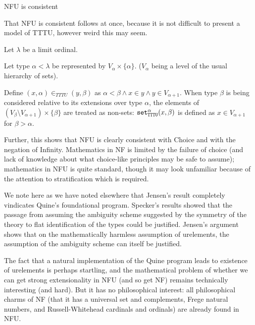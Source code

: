 \documentclass{slides}
\begin{document}
\begin{slide}

{\Large NFU is consistent}

That NFU is consistent follows at once, because it is not difficult to present a model of TTTU, however weird this may seem.

Let $\lambda$ be a limit ordinal.

Let type $\alpha<\lambda$ be represented by $V_{\alpha} \times \{\alpha\}$. ($V_\alpha$ being a level of the usual hierarchy of sets).

Define $(x,\alpha) \in_{TTTU} (y,\beta)$ as $\alpha<\beta \wedge x \in y \wedge y \in V_{\alpha+1}$.    When type
$\beta$ is being considered relative to its extensions over type $\alpha$, the elements of $(V_{\beta} \setminus V_{\alpha+1})\times \{\beta\}$ are treated as non-sets:  ${\tt set}^{\alpha}_{\tt TTTU}(x,\beta)$ is defined as $x \in V_{\alpha+1}$ for $\beta>\alpha$.

Further, this shows that NFU is clearly consistent with Choice and with the negation of Infinity.  Mathematics in NF is limited by the failure of choice (and lack of knowledge about what choice-like principles may be safe to assume);  mathematics in NFU is quite standard, though it may look unfamiliar because of the attention to stratification which is required.

\end{slide}

\begin{slide}


We note here as we have noted elsewhere that Jensen's result completely vindicates Quine's foundational program.   Specker's results showed that the passage from assuming the ambiguity scheme suggested by the symmetry of the theory to flat identification of the types could be justified.  Jensen's argument shows that on the mathematically harmless assumption of urelements, the assumption of the ambiguity scheme can itself be justified.

The fact that a natural implementation of the Quine program leads to existence of urelements is perhaps startling, and the mathematical problem of whether we can get strong extensionality in NFU (and so get NF) remains technically interesting (and hard).  But it has no philosophical interest: all philosophical charms of NF (that it has a universal set and complements, Frege natural numbers, and Russell-Whitehead cardinals and ordinals) are already found in NFU.

\end{slide}
\end{document}
